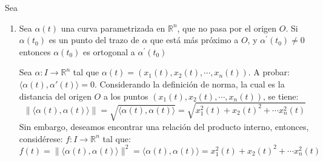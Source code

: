 






\begin{problema}
    Sea
    \begin{enumerate}
        \item Sea $\alpha(t)$ una curva parametrizada en $\mathbb{R}^{n}$, que no pasa por el origen $O$. Si $\alpha\left(t_{0}\right)$ es un punto del trazo de $\alpha$ que está más próximo a $O$, y $\alpha^{\prime}\left(t_{0}\right) \neq 0$ entonces $\alpha\left(t_{0}\right)$ es ortogonal a $\alpha^{\prime}\left(t_{0}\right)$
            \begin{sol}
                Sea $\alpha: I\to \mathbb{R}^n$ tal que $\alpha(t)=(x_1(t),x_2(t),\cdots, x_n(t))$. A probar: $\langle\alpha(t), \alpha'(t)\rangle=0$. Considerando la definición de norma, la cual es la distancia del origen $O$ a los puntos $(x_1(t),x_2(t),\cdots, x_n(t))$, se tiene: 
                $$\|\langle \alpha(t),\alpha(t)\rangle\|=\sqrt{\langle\alpha(t),\alpha(t)\rangle}=\sqrt{x_1^2(t)+x_2(t)^2+\cdots x_n^2(t)}$$
                Sin embargo, deseamos encontrar una relación del producto interno, entonces, considérese: $f:I\to \mathbb{R}^n$ tal que: 
                $$f(t)=\|\langle \alpha(t),\alpha(t)\rangle\|^2=\langle\alpha(t),\alpha(t)\rangle=x_1^2(t)+x_2(t)^2+\cdots x_n^2(t)$$


\end{sol}
\end{enumerate}
\end{problema}
